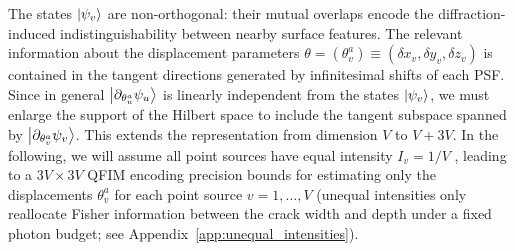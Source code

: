 \documentclass[reprint,amsmath,amssymb,aps,prl,floatfix,groupedaddress,superscriptaddress]{revtex4-2}
\begin{document}
The states ${\ket{\psi_v}}$ are non-orthogonal: their mutual overlaps encode the diffraction-induced indistinguishability between nearby surface features. %
The relevant information about the displacement parameters $\theta = (\theta_v^a) \equiv (\delta x_v,\delta y_v,\delta z_v)$ is contained in the tangent directions generated by infinitesimal shifts of each PSF. %
Since in general $\ket{\partial_{\theta_u^a}\psi_u}$ is linearly independent from the states $\ket{\psi_v}$,%
we must  enlarge the support of the Hilbert space to include the tangent subspace spanned by ${\ket{\partial_{\theta_v^a}\psi_v}}$. This extends the representation from dimension $V$ to $V+3V$.
In the following, we will assume all point sources have equal intensity $I_v=1/V$ \cite{noteintensity}, leading to a  $3V \times 3V$ QFIM encoding precision bounds for estimating only the  displacements $\theta_v^a$ for each point source $v=1,\ldots,V$ {\color{red}(unequal intensities only reallocate Fisher information between the crack width and depth under a fixed photon budget; see Appendix~\ref{app:unequal_intensities})}.
\end{document}
